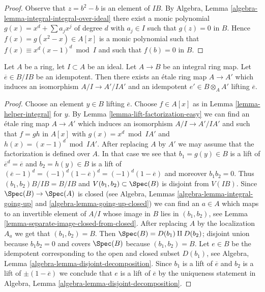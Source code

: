 \begin{proof}
Observe that $z = b^2 - b$ is an element of $IB$. By
Algebra, Lemma \ref{algebra-lemma-integral-integral-over-ideal}
there exist a monic polynomial
$g(x) = x^d + \sum a_j x^j$ of degree $d$ with $a_j \in I$ such that
$g(z) = 0$ in $B$. Hence $f(x) = g(x^2 - x) \in A[x]$ is a monic
polynomial such that $f(x) \equiv x^d(x - 1)^d \bmod I$
and such that $f(b) = 0$ in $B$.
\end{proof}

\begin{lemma}
\label{lemma-lift-idempotent-upstairs}
Let $A$ be a ring, let $I \subset A$ be an ideal.
Let $A \to B$ be an integral ring map.
Let $\overline{e} \in B/IB$ be an idempotent.
Then there exists an \'etale ring map $A \to A'$
which induces an isomorphism $A/I \to A'/IA'$ and an idempotent
$e' \in B \otimes_A A'$ lifting $\overline{e}$.
\end{lemma}

\begin{proof}
Choose an element $y \in B$ lifting $\overline{e}$.
Choose $f \in A[x]$ as in Lemma \ref{lemma-helper-integral} for $y$.
By Lemma \ref{lemma-lift-factorization-easy}
we can find an \'etale ring map $A \to A'$ which induces
an isomorphism $A/I \to A'/IA'$ and such that $f = gh$
in $A[x]$ with $g(x) = x^d \bmod IA'$ and $h(x) = (x - 1)^d \bmod IA'$.
After replacing $A$ by $A'$ we may assume that the factorization
is defined over $A$. In that case we see that
$b_1 = g(y) \in B$ is a lift of $\overline{e}^d = \overline{e}$ and
$b_2 = h(y) \in B$ is a lift of
$(\overline{e} - 1)^d = (-1)^d (1 - \overline{e})^d = (-1)^d(1 - \overline{e})$
and moreover $b_1b_2 = 0$. Thus $(b_1, b_2)B/IB = B/IB$ and
$V(b_1, b_2) \subset \Spec(B)$ is disjoint from $V(IB)$. Since
$\Spec(B) \to \Spec(A)$ is closed (see
Algebra, Lemmas \ref{algebra-lemma-integral-going-up} and
\ref{algebra-lemma-going-up-closed})
we can find an $a \in A$ which maps to an invertible element
of $A/I$ whose image in $B$ lies in $(b_1, b_2)$, see
Lemma \ref{lemma-separate-image-closed-from-closed}.
After replacing $A$ by the localization $A_a$ we get that
$(b_1, b_2) = B$. Then $\Spec(B) = D(b_1) \amalg D(b_2)$;
disjoint union because $b_1b_2 = 0$ and covers
$\Spec(B)$ because $(b_1, b_2) = B$. Let $e \in B$ be the idempotent
corresponding to the open and closed subset $D(b_1)$, see
Algebra, Lemma \ref{algebra-lemma-disjoint-decomposition}.
Since $b_1$ is a lift of $\overline{e}$ and $b_2$ is a
lift of $\pm (1 - \overline{e})$ we conclude that $e$ is
a lift of $\overline{e}$ by the uniqueness statement in
Algebra, Lemma \ref{algebra-lemma-disjoint-decomposition}.
\end{proof}

